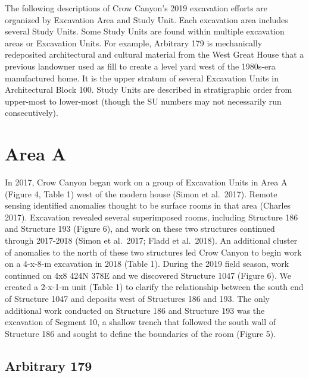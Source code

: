 \documentclass[
  12pt,
]{krantz}
\begin{document}
The following descriptions of Crow Canyon's 2019 excavation efforts are
organized by Excavation Area and Study Unit. Each excavation area
includes several Study Units. Some Study Units are found within multiple
excavation areas or Excavation Units. For example, Arbitrary 179 is
mechanically redeposited architectural and cultural material from the
West Great House that a previous landowner used as fill to create a
level yard west of the 1980s-era manufactured home. It is the upper
stratum of several Excavation Units in Architectural Block 100. Study
Units are described in stratigraphic order from upper-most to lower-most
(though the SU numbers may not necessarily run consecutively).

\hypertarget{area-a}{%
\section{Area A}\label{area-a}}

In 2017, Crow Canyon began work on a group of Excavation Units in Area A
(Figure 4, Table 1) west of the modern house (Simon et al.~2017). Remote
sensing identified anomalies thought to be surface rooms in that area
(Charles 2017). Excavation revealed several superimposed rooms,
including Structure 186 and Structure 193 (Figure 6), and work on these
two structures continued through 2017-2018 (Simon et al.~2017; Fladd et
al.~2018). An additional cluster of anomalies to the north of these two
structures led Crow Canyon to begin work on a 4-x-8-m excavation in 2018
(Table 1). During the 2019 field season, work continued on 4x8 424N 378E
and we discovered Structure 1047 (Figure 6). We created a 2-x-1-m unit
(Table 1) to clarify the relationship between the south end of Structure
1047 and deposits west of Structures 186 and 193. The only additional
work conducted on Structure 186 and Structure 193 was the excavation of
Segment 10, a shallow trench that followed the south wall of Structure
186 and sought to define the boundaries of the room (Figure 5).

\hypertarget{arbitrary-179}{%
\subsection{Arbitrary 179}\label{arbitrary-179}}
\end{document}
